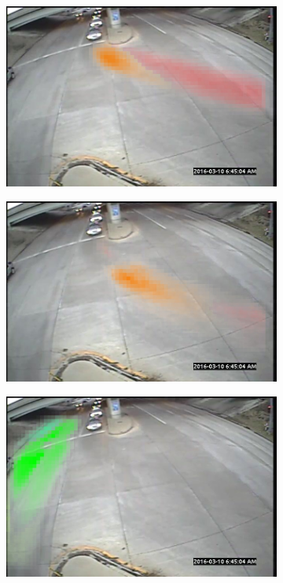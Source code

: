 \begin{figure}
    \begin{subfigure}{0.32\linewidth}
        \includegraphics[width=\linewidth]{./img/scene_learning/topics/topic-1.jpg}
    \end{subfigure}%
    \begin{subfigure}{0.32\linewidth}
        \includegraphics[width=\linewidth]{./img/scene_learning/topics/topic-3.jpg}
    \end{subfigure}%
    \begin{subfigure}{0.32\linewidth}
        \includegraphics[width=\linewidth]{./img/scene_learning/topics/topic-0.jpg}
    \end{subfigure}%


\end{figure}
